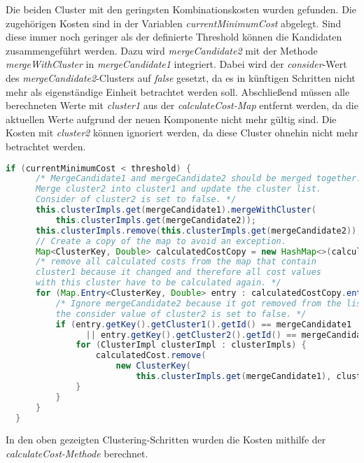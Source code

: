 Die beiden Cluster mit den geringsten Kombinationskosten wurden gefunden.
Die zugehörigen Kosten sind in der Variablen \emph{currentMinimumCost} abgelegt.
Sind diese immer noch geringer als der definierte Threshold können die Kandidaten zusammengeführt werden.
Dazu wird \emph{mergeCandidate2} mit der Methode \emph{mergeWithCluster} in \emph{mergeCandidate1} integriert.
Dabei wird der \emph{consider}-Wert des \emph{mergeCandidate2}-Clusters auf \emph{false} gesetzt,
da es in künftigen Schritten nicht mehr als eigenständige Einheit betrachtet werden soll.
Abschließend müssen alle berechneten Werte mit \emph{cluster1} aus der \emph{calculateCost-Map} entfernt werden,
da die aktuellen Werte aufgrund der neuen Komponente nicht mehr gültig sind.
Die Kosten mit \emph{cluster2} können ignoriert werden, da diese Cluster ohnehin nicht mehr betrachtet werden.
\begin{lstfloat}
\begin{lstlisting}[language=Java, label={lst:ClustMerge}, caption=Cluster-Methode: Mergevorgang.]
  if (currentMinimumCost < threshold) {
      /* MergeCandidate1 and mergeCandidate2 should be merged together.
      Merge cluster2 into cluster1 and update the cluster list.
      Consider of cluster2 is set to false. */
      this.clusterImpls.get(mergeCandidate1).mergeWithCluster(
          this.clusterImpls.get(mergeCandidate2));  
      this.clusterImpls.remove(this.clusterImpls.get(mergeCandidate2));
      // Create a copy of the map to avoid an exception.
      Map<ClusterKey, Double> calculatedCostCopy = new HashMap<>(calculatedCost); 
      /* remove all calculated costs from the map that contain
      cluster1 because it changed and therefore all cost values
      with this cluster have to be calculated again. */
      for (Map.Entry<ClusterKey, Double> entry : calculatedCostCopy.entrySet()) {
          /* Ignore mergeCandidate2 because it got removed from the list and
          the consider value of cluster2 is set to false. */
          if (entry.getKey().getCluster1().getId() == mergeCandidate1
                || entry.getKey().getCluster2().getId() == mergeCandidate1) {
              for (ClusterImpl clusterImpl : clusterImpls) {
                  calculatedCost.remove(
                      new ClusterKey(
                          this.clusterImpls.get(mergeCandidate1), clusterImpl));
              }
          }
      }
  }
\end{lstlisting}
\end{lstfloat}
In den oben gezeigten Clustering-Schritten wurden die Kosten mithilfe der \emph{calculateCost-Methode} berechnet.
